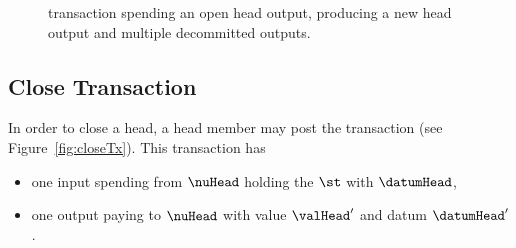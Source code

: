 \begin{figure}[H]
	\centering
	
	\caption{\mtxDecrement{} transaction spending an open head output,
		producing a new head output and multiple decommitted outputs.}\label{fig:decrementTx}
\end{figure}

\subsection{Close Transaction}\label{sec:close-tx}

In order to close a head, a head member may post the \mtxClose{} transaction
(see Figure~\ref{fig:closeTx}). This transaction has
\begin{itemize}
	\item one input spending from $\nuHead$ holding the $\st$ with $\datumHead$,
	\item one output paying to $\nuHead$ with value $\valHead'$ and
	      datum $\datumHead'$.
\end{itemize}

